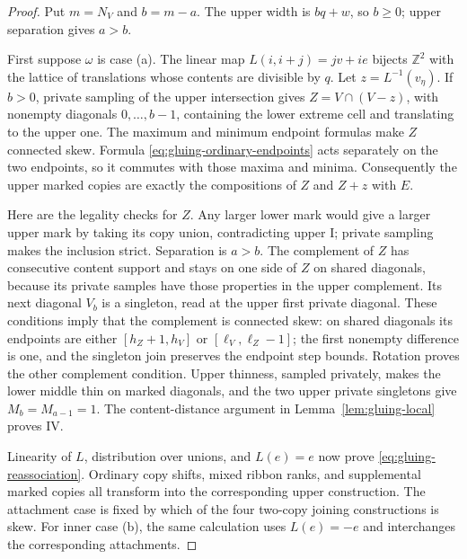 \documentclass[11pt,a4paper]{amsart}
\numberwithin{equation}{section}
\theoremstyle{plain}
\theoremstyle{definition}
\newcommand{\Z}{\mathbb Z}
\begin{document}
\begin{proof}
Put \(m=N_V\) and \(b=m-a\).  The upper width is \(bq+w\), so \(b\ge0\); upper separation gives \(a>b\).

First suppose \(\omega\) is case (a).  The linear map \(L(i,i+j)=jv+ie\) bijects \(\Z^2\) with the lattice of translations whose contents are divisible by \(q\).  Let \(z=L^{-1}(v_\eta)\).  If \(b>0\), private sampling of the upper intersection gives
\(Z=V\cap(V-z)\), with nonempty diagonals \(0,\ldots,b-1\), containing the lower extreme cell and translating to the upper one.  The maximum and minimum endpoint formulas make \(Z\) connected skew.  Formula \eqref{eq:gluing-ordinary-endpoints} acts separately on the two endpoints, so it commutes with those maxima and minima.  Consequently the upper marked copies are exactly the compositions of \(Z\) and \(Z+z\) with \(E\).

Here are the legality checks for \(Z\).  Any larger lower mark would give a larger upper mark by taking its copy union, contradicting upper I; private sampling makes the inclusion strict.  Separation is \(a>b\).  The complement of \(Z\) has consecutive content support and stays on one side of \(Z\) on shared diagonals, because its private samples have those properties in the upper complement.  Its next diagonal \(V_b\) is a singleton, read at the upper first private diagonal.  These conditions imply that the complement is connected skew: on shared diagonals its endpoints are either \([h_Z+1,h_V]\) or \([\ell_V,\ell_Z-1]\); the first nonempty difference is one, and the singleton join preserves the endpoint step bounds.  Rotation proves the other complement condition.  Upper thinness, sampled privately, makes the lower middle thin on marked diagonals, and the two upper private singletons give \(M_b=M_{a-1}=1\).  The content-distance argument in Lemma~\ref{lem:gluing-local} proves IV.

Linearity of \(L\), distribution over unions, and \(L(e)=e\) now prove \eqref{eq:gluing-reassociation}.  Ordinary copy shifts, mixed ribbon ranks, and supplemental marked copies all transform into the corresponding upper construction.  The attachment case is fixed by which of the four two-copy joining constructions is skew.  For inner case (b), the same calculation uses \(L(e)=-e\) and interchanges the corresponding attachments.


\end{proof}
\end{document}
